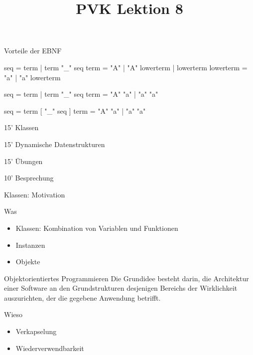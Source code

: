 \ifnum\conditionmacro=1 \documentclass[handout,usenames,dvipsnames]{beamer}\fi
\begin{document}
\begin{frame}[fragile]{Vorteile der EBNF}
\begin{TPPython}
seq = term | term "_" seq
term = "A" | "A" lowerterm | lowerterm
lowerterm = "a" | "a" lowerterm


seq = term | term "_" seq
term = "A" { "a" } | "a" { "a" }

seq = term [ "_" seq ]
term = "A" { "a" } | "a" { "a" }
\end{TPPython}
\end{frame}


\title{PVK Lektion 8}

\maketitle

\begin{TFTimeSchedule}
\item 15' Klassen
\item 15' Dynamische Datenstrukturen
\item 15' Übungen
\item 10' Besprechung
\end{TFTimeSchedule}

\begin{frame}{Klassen: Motivation}
\begin{block}{Was}
\begin{itemize}
\item Klassen: Kombination von Variablen und Funktionen
\item Instanzen
\item Objekte
\end{itemize}
\end{block}

\begin{block}{Objektorientiertes Programmieren}
Die Grundidee besteht darin, die Architektur einer Software an den Grundstrukturen desjenigen Bereichs der Wirklichkeit auszurichten, der die gegebene Anwendung betrifft.
\end{block}

\begin{block}{Wieso}
\begin{itemize}
\item Verkapselung
\item Wiederverwendbarkeit
\end{itemize}
\end{block}

\end{frame}
\end{document}
